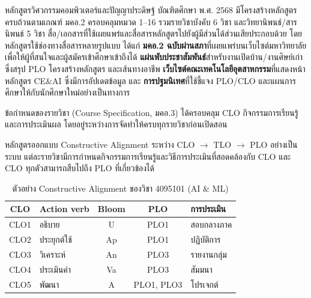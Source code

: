 


หลักสูตรวิศวกรรมคอมพิวเตอร์และปัญญาประดิษฐ์ บัณฑิตศึกษา พ.ศ. 2568 มีโครงสร้างหลักสูตรครบถ้วนตามเกณฑ์ มคอ.2 ครอบคลุมหมวด 1--16 รวมรายวิชาบังคับ 6 วิชา และวิทยานิพนธ์/สารนิพนธ์ 5 วิชา สื่อ/เอกสารที่ใช้เผยแพร่และสื่อสารหลักสูตรไปยังผู้มีส่วนได้ส่วนเสียประกอบด้วย
โดยหลักสูตรใช้ช่องทางสื่อสารหลายรูปแบบ ได้แก่ \textbf{มคอ.2 ฉบับผ่านสภา}ที่เผยแพร่บนเว็บไซต์มหาวิทยาลัยเพื่อให้ผู้ที่สนใจและผู้สมัครเข้าศึกษาเข้าถึงได้ \textbf{แผ่นพับประชาสัมพันธ์}สำหรับงานเปิดบ้าน/งานศิษย์เก่าซึ่งสรุป PLO โครงสร้างหลักสูตร และเส้นทางอาชีพ \textbf{เว็บไซต์คณะเทคโนโลยีอุตสาหกรรม}ที่แสดงหน้าหลักสูตร CE\&AI ซึ่งมีการอัปเดตข้อมูล และ \textbf{การปฐมนิเทศ}ที่ใช้ชี้แจง PLO/CLO และแผนการศึกษาให้กับนักศึกษาใหม่อย่างเป็นทางการ

ข้อกำหนดของรายวิชา (Course Specification, มคอ.3) ได้ครอบคลุม CLO กิจกรรมการเรียนรู้ และการประเมินผล โดยอยู่ระหว่างการจัดทำให้ครบทุกรายวิชาก่อนเปิดสอน



หลักสูตรออกแบบ Constructive Alignment ระหว่าง CLO $\rightarrow$ TLO $\rightarrow$ PLO อย่างเป็นระบบ แต่ละรายวิชามีการกำหนดกิจกรรมการเรียนรู้และวิธีการประเมินที่สอดคล้องกับ CLO และ CLO ทุกตัวสามารถสืบไปถึง PLO ที่เกี่ยวข้องได้

\begin{table}[H]
  \centering
  \caption{ตัวอย่าง Constructive Alignment ของวิชา 4095101 (AI \& ML)}
  \label{tbl:clo_plo_example}
  \begin{tabularx}{\linewidth}{|c|>{\raggedright\arraybackslash}p{2.4cm}|c|c|Y|}
    \hline
    \textbf{CLO} & \textbf{Action verb} & \textbf{Bloom} & \textbf{PLO} & \textbf{การประเมิน} \\
    \hline
    CLO1 & อธิบาย       & U  & PLO1 & สอบกลางภาค \\
    CLO2 & ประยุกต์ใช้ & Ap & PLO1 & ปฏิบัติการ \\
    CLO3 & วิเคราะห์   & An & PLO3 & รายงานกลุ่ม \\
    CLO4 & ประเมินค่า  & Va & PLO3 & สัมมนา \\
    CLO5 & พัฒนา       & A  & PLO1, PLO3 & โปรเจกต์ \\
    \hline
  \end{tabularx}
\end{table}

